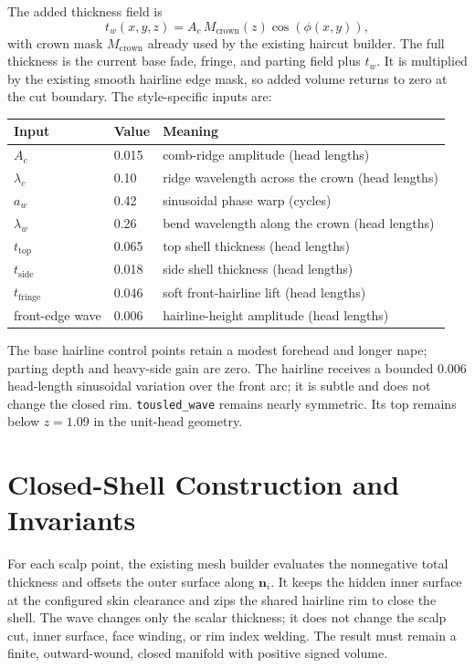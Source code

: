 \documentclass[11pt]{article}
\begin{document}
The added thickness field is
\begin{equation}
 t_w(x,y,z)=A_c\,M_{\mathrm{crown}}(z)\cos(\phi(x,y)),
\end{equation}
with crown mask $M_{\mathrm{crown}}$ already used by the existing haircut
builder. The full thickness is the current base fade, fringe, and parting
field plus $t_w$. It is multiplied by the existing smooth hairline edge mask,
so added volume returns to zero at the cut boundary. The style-specific inputs
are:
\begin{center}
\begin{tabular}{lll}
\toprule
Input & Value & Meaning \\
\midrule
$A_c$ & 0.015 & comb-ridge amplitude (head lengths) \\
$\lambda_c$ & 0.10 & ridge wavelength across the crown (head lengths) \\
$a_w$ & 0.42 & sinusoidal phase warp (cycles) \\
$\lambda_w$ & 0.26 & bend wavelength along the crown (head lengths) \\
$t_{\mathrm{top}}$ & 0.065 & top shell thickness (head lengths) \\
$t_{\mathrm{side}}$ & 0.018 & side shell thickness (head lengths) \\
$t_{\mathrm{fringe}}$ & 0.046 & soft front-hairline lift (head lengths) \\
front-edge wave & 0.006 & hairline-height amplitude (head lengths) \\
\bottomrule
\end{tabular}
\end{center}
The base hairline control points retain a modest forehead and longer nape;
parting depth and heavy-side gain are zero. The hairline receives a bounded
0.006 head-length sinusoidal variation over the front arc; it is subtle and
does not change the closed rim. \texttt{tousled\_wave} remains nearly symmetric. Its top remains below $z=1.09$ in the unit-head geometry.

\section{Closed-Shell Construction and Invariants}
For each scalp point, the existing mesh builder evaluates the nonnegative
total thickness and offsets the outer surface along $\mathbf{n}_i$. It keeps
the hidden inner surface at the configured skin clearance and zips the shared
hairline rim to close the shell. The wave changes only the scalar thickness;
it does not change the scalp cut, inner surface, face winding, or rim index
welding. The result must remain a finite, outward-wound, closed manifold with
positive signed volume.
\end{document}
